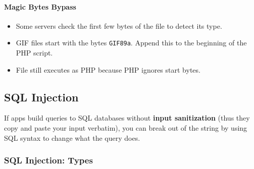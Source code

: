 \documentclass[12pt, letterpaper]{article}
\begin{document}
\paragraph*{Magic Bytes Bypass}

\begin{itemize}
    \item Some servers check the first few bytes of the file to detect its type.
    \item GIF files start with the bytes \texttt{GIF89a}. Append this to the beginning of the PHP script.
    \item File still executes as PHP because PHP ignores start bytes.
\end{itemize}

\subsection*{SQL Injection}

If apps build queries to SQL databases without \textbf{input sanitization} (thus they copy and paste your input verbatim), you can break out of the string by using SQL syntax to change what the query does.

\subsubsection*{SQL Injection: Types}
\end{document}
